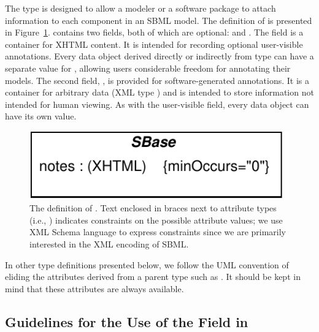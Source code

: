 \documentclass[10pt]{cekarticle}
\newcommand{\vref}[1]{\ref{#1}}
\begin{document}
The type  is designed to allow a modeler or a software package
to attach information to each component in an SBML model.  The definition
of  is presented in Figure~\vref{fig:identified}.
 contains two fields, both of which are optional:
 and .  The field  is a
container for XHTML content.  It is intended for recording optional
user-visible annotations.  Every data object derived directly or indirectly
from type  can have a separate value for ,
allowing users considerable freedom for annotating their models.  The
second field, , is provided for software-generated
annotations.  It is a container for arbitrary data (XML type )
and is intended to store information not intended for human viewing.  As
with the user-visible  field, every data object can have its
own  value.

\begin{figure}[b]
  \centering
  \includegraphics[scale = 0.68]{identified}
  \caption{The definition of .  Text enclosed in braces next
    to attribute types (i.e., ) indicates
    constraints on the possible attribute values; we use XML Schema
    language to express constraints since we are primarily interested in
    the XML encoding of SBML.}
  \label{fig:identified}
\end{figure}

In other type definitions presented below, we follow the UML convention of
eliding the attributes derived from a parent type such as .
It should be kept in mind that these attributes are always available.


\subsection{Guidelines for the Use of the  Field in
  } 
\end{document}
